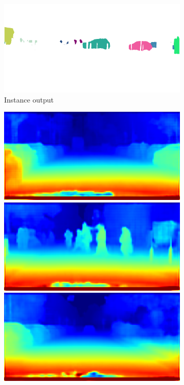 \begin{figure}[p]
{{\begin{subfigure}[t]{0.24\linewidth}
\begin{center}
		\includegraphics[width=\linewidth,trim={0px 60px 0 0px},clip]{results/segnet_19_output_3.png}
  \caption{Instance output}
\end{center}
\end{subfigure}
\begin{subfigure}[t]{0.24\linewidth}
\begin{center}
		\includegraphics[width=\linewidth,trim={0px 60px 0 0px},clip]{results/segnet_18_output_4.png}
		\includegraphics[width=\linewidth,trim={0px 60px 0 0px},clip]{results/segnet_20_output_4.png}
		\includegraphics[width=\linewidth,trim={0px 60px 0 0px},clip]{results/segnet_43_output_4.png}

\end{center}
\end{subfigure}}}
\end{figure}
